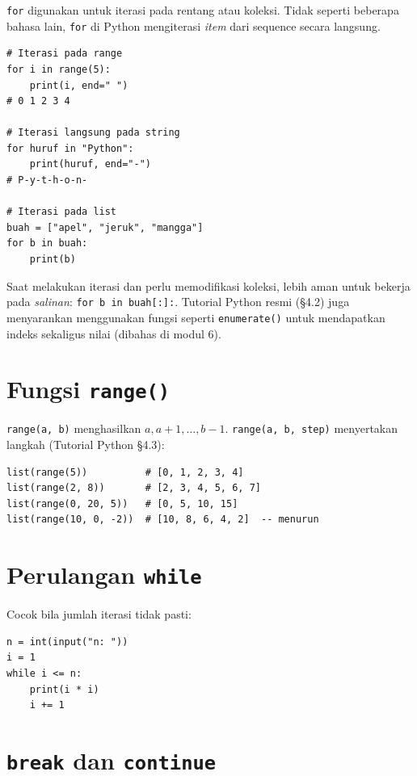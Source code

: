 ﻿\documentclass[../main.tex]{subfiles}
\begin{document}
\texttt{for} digunakan untuk iterasi pada rentang atau koleksi. Tidak seperti beberapa bahasa lain, \texttt{for} di Python mengiterasi \textit{item} dari sequence secara langsung.

\begin{lstlisting}[caption=for dengan range dan iterasi langsung (Tutorial Python ss4.2)]
# Iterasi pada range
for i in range(5):
    print(i, end=" ")
# 0 1 2 3 4

# Iterasi langsung pada string
for huruf in "Python":
    print(huruf, end="-")
# P-y-t-h-o-n-

# Iterasi pada list
buah = ["apel", "jeruk", "mangga"]
for b in buah:
    print(b)
\end{lstlisting}

\begin{konsep}
Saat melakukan iterasi dan perlu memodifikasi koleksi, lebih aman untuk bekerja pada \textit{salinan}: \texttt{for b in buah[:]:}. Tutorial Python resmi (§4.2) juga menyarankan menggunakan fungsi seperti \texttt{enumerate()} untuk mendapatkan indeks sekaligus nilai (dibahas di modul 6).
\end{konsep}

\section{Fungsi \texttt{range()}}

\texttt{range(a, b)} menghasilkan $a, a+1, \ldots, b-1$. \texttt{range(a, b, step)} menyertakan langkah (Tutorial Python §4.3):

\begin{lstlisting}[caption=Variasi range]
list(range(5))          # [0, 1, 2, 3, 4]
list(range(2, 8))       # [2, 3, 4, 5, 6, 7]
list(range(0, 20, 5))   # [0, 5, 10, 15]
list(range(10, 0, -2))  # [10, 8, 6, 4, 2]  -- menurun
\end{lstlisting}

\section{Perulangan \texttt{while}}

Cocok bila jumlah iterasi tidak pasti:

\begin{lstlisting}[caption=while]
n = int(input("n: "))
i = 1
while i <= n:
    print(i * i)
    i += 1
\end{lstlisting}

\section{\texttt{break} dan \texttt{continue}}
\end{document}
